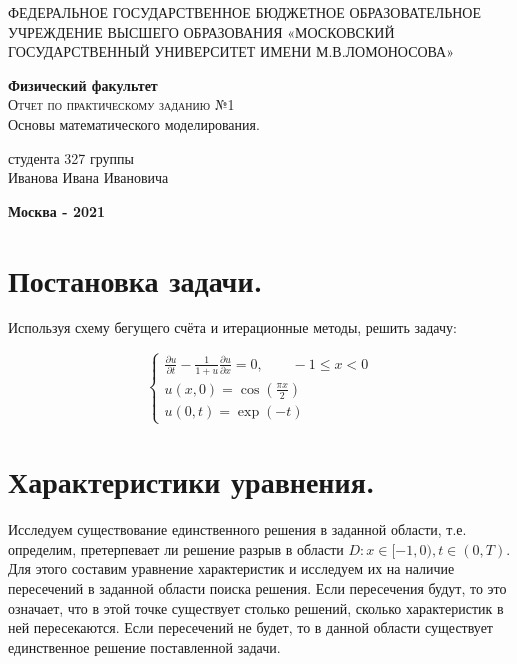 \documentclass[a4paper,14pt]{article}
\begin{document}
\begin{titlepage}
\begin{center}
    \large
    ФЕДЕРАЛЬНОЕ ГОСУДАРСТВЕННОЕ БЮДЖЕТНОЕ ОБРАЗОВАТЕЛЬНОЕ УЧРЕЖДЕНИЕ ВЫСШЕГО ОБРАЗОВАНИЯ «МОСКОВСКИЙ ГОСУДАРСТВЕННЫЙ УНИВЕРСИТЕТ ИМЕНИ М.В.ЛОМОНОСОВА»
     
    \textbf{Физический факультет}\\
    \vspace{4cm}
    \textsc{\Large Отчет по практическому заданию №1}\\[5mm]
    {\LARGE Основы математического моделирования.}
\end{center}
\vspace{7cm}
\null
\begin{flushright}
\normalsize студента 327 группы
\\Иванова Ивана Ивановича
\end{flushright}
\vfill
\begin{center}
\textbf{Москва - 2021}
\end{center}
\end{titlepage}


\section{Постановка задачи.}
Используя схему бегущего счёта и итерационные методы, решить задачу:

\begin{equation*}
\begin{cases}
   \frac{\partial u}{\partial t} - \frac{1}{1+u} \frac{\partial u}{\partial x}=0, \qquad -1\leqslant x<0\\
   u(x,0)=\cos(\frac{\pi x}{2})\\
   u(0,t)= \exp(-t)
 \end{cases}
\end{equation*}


\section{Характеристики уравнения.}
Исследуем существование единственного решения в заданной области, т.е.
определим, претерпевает ли решение разрыв в области $D: {x \in [−1,0), t \in (0, T)}$. Для этого составим уравнение характеристик и исследуем их на наличие пересечений в заданной области поиска решения. Если пересечения будут, то это означает, что в этой точке существует столько решений, сколько характеристик в ней пересекаются. Если пересечений не будет, то в данной области существует единственное решение поставленной задачи.
\end{document}
